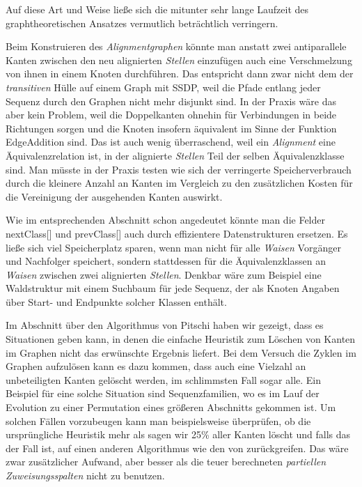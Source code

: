 \noindent Auf diese Art und Weise ließe sich die mitunter sehr lange Laufzeit des graphtheoretischen Ansatzes vermutlich beträchtlich verringern.

Beim Konstruieren des \emph{Alignmentgraphen} könnte man anstatt zwei antiparallele Kanten zwischen den neu alignierten \emph{Stellen} einzufügen auch eine Verschmelzung von ihnen in einem Knoten durchführen. Das entspricht dann zwar nicht dem der \emph{transitiven} Hülle auf einem Graph mit SSDP, weil die Pfade entlang jeder Sequenz durch den Graphen nicht mehr disjunkt sind. In der Praxis wäre das aber kein Problem, weil die Doppelkanten ohnehin für Verbindungen in beide Richtungen sorgen und die Knoten insofern äquivalent im Sinne der Funktion \textrm{EdgeAddition} sind. Das ist auch wenig überraschend, weil ein \emph{Alignment} eine Äquivalenzrelation ist, in der alignierte \emph{Stellen} Teil der selben Äquivalenzklasse sind. Man müsste in der Praxis testen wie sich der verringerte Speicherverbrauch durch die kleinere Anzahl an Kanten im Vergleich zu den zusätzlichen Kosten für die Vereinigung der ausgehenden Kanten auswirkt.

Wie im entsprechenden Abschnitt schon angedeutet könnte man die Felder nextClass[] und prevClass[] auch durch effizientere Datenstrukturen ersetzen. Es ließe sich viel Speicherplatz sparen, wenn man nicht für alle \emph{Waisen} Vorgänger und Nachfolger speichert, sondern stattdessen für die Äquivalenzklassen an \emph{Waisen} zwischen zwei alignierten \emph{Stellen}. Denkbar wäre zum Beispiel eine Waldstruktur mit einem Suchbaum für jede Sequenz, der als Knoten Angaben über Start- und Endpunkte solcher Klassen enthält.

Im Abschnitt über den Algorithmus von Pitschi haben wir gezeigt, dass es Situationen geben kann, in denen die einfache Heuristik zum Löschen von Kanten im Graphen nicht das erwünschte Ergebnis liefert. Bei dem Versuch die Zyklen im Graphen aufzulösen kann es dazu kommen, dass auch eine Vielzahl an unbeteiligten Kanten gelöscht werden, im schlimmsten Fall sogar alle. Ein Beispiel für eine solche Situation sind Sequenzfamilien, wo es im Lauf der Evolution zu einer Permutation eines größeren Abschnitts gekommen ist. Um solchen Fällen vorzubeugen kann man beispielsweise überprüfen, ob die ursprüngliche Heuristik mehr als sagen wir 25\% aller Kanten löscht und falls das der Fall ist, auf einen anderen Algorithmus wie den von \cite{els93} zurückgreifen. Das wäre zwar zusätzlicher Aufwand, aber besser als die teuer berechneten \emph{partiellen Zuweisungsspalten} nicht zu benutzen.

